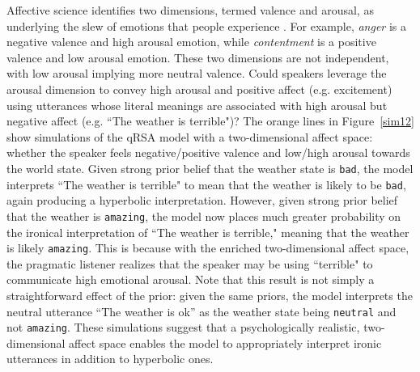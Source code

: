 \documentclass[10pt,letterpaper]{article}
\begin{document}
Affective science identifies two dimensions, termed valence and arousal, as underlying the slew of emotions that people experience \cite{russell1980circumplex}. 
For example, \emph{anger} is a negative valence and high arousal emotion, while \emph{contentment} is a positive valence and low arousal emotion. 
These two dimensions are not independent, with low arousal implying more neutral valence. 
Could speakers leverage the arousal dimension to convey high arousal and positive affect (e.g. excitement) using utterances whose literal meanings are associated with high arousal but negative affect (e.g. ``The weather is terrible")? The orange lines in Figure~\ref{sim12} show simulations of the qRSA model with a two-dimensional affect space: whether the speaker feels negative/positive valence and low/high arousal towards the world state. Given strong prior belief that the weather state is \texttt{bad}, the model interprets ``The weather is terrible" to mean that the weather is likely to be \texttt{bad}, again producing a hyperbolic interpretation. However, given strong prior belief that the weather is \texttt{amazing}, the model now places much greater probability on the ironical interpretation of ``The weather is terrible," meaning that the weather is likely \texttt{amazing}. This is because with the enriched two-dimensional affect space, the pragmatic listener realizes that the speaker may be using ``terrible" to communicate high emotional arousal. Note that this result is not simply a straightforward effect of the prior: given the same priors, the model interprets the neutral utterance ``The weather is ok'' as the weather state being \texttt{neutral} and not \texttt{amazing}. %
These simulations suggest that a psychologically realistic, two-dimensional affect space enables the model to appropriately interpret ironic utterances in addition to hyperbolic ones. 

\end{document}

